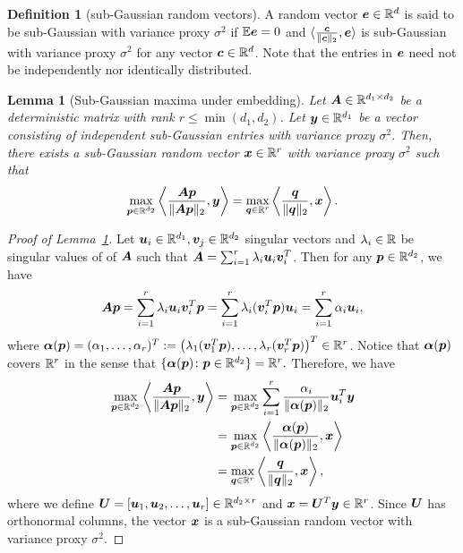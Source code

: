 \documentclass[12pt]{article}
\newtheorem{lem}{Lemma}
\theoremstyle{definition}
\newtheorem{defn}{Definition}
\begin{document}
\begin{defn}[sub-Gaussian random vectors]
 A random vector $\bm{e} \in \mathbb{R}^d$ is said to be sub-Gaussian with variance proxy $\sigma^2$ if $\mathbb{E}\bm{e}=0$ and $\langle {\bm{c}\over \lVert\bm{c}\rVert_2}, \bm{e}\rangle$ is sub-Gaussian with variance proxy $\sigma^2$ for any vector $\bm{c}\in\mathbb{R}^d$.   Note that the entries in $\bm{e}$ need not be independently nor identically distributed. 
 \end{defn}
 
\begin{lem}[Sub-Gaussian maxima under embedding]\label{lem:embedding}
Let $\bm A\in\mathbb{R}^{d_1\times d_2}$ be a deterministic matrix with rank $r\leq\min(d_1,d_2)$. Let $\bm{y}\in\mathbb{R}^{d_1}$ be a vector consisting of independent sub-Gaussian entries with variance proxy $\sigma^2$. Then, there exists a sub-Gaussian random vector $\bm x\in\mathbb{R}^r$  with variance proxy $\sigma^2$ such that  
\begin{align}
    \max_{\bm{p}\in\mathbb{R}^{d_2}}\left\langle \frac{\bm A\bm{p}}{\|\bm A\bm{p}\|_2},\bm{y}\right\rangle = \max_{\bm{q}\in\mathbb{R}^r}\left\langle \frac{\bm{q}}{\|\bm{q}\|_2},\bm x\right\rangle.
\end{align}
\end{lem}

\begin{proof}[Proof of Lemma~\ref{lem:embedding}]
Let $\bm{u}_i\in\mathbb{R}^{d_1},\bm{v}_j\in\mathbb{R}^{d_2}$ singular vectors and $\lambda_i\in\mathbb{R}$ be singular values of of $\bm A$ such that
 $\bm A = \sum_{i=1}^r \lambda_i\bm{u}_i\bm{v}_i^T$.
Then  for any $\bm{p}\in\mathbb{R}^{d_2}$, we have 
\begin{align}
    \bm A\bm{p} = \sum_{i=1}^r\lambda_i \bm{u}_i\bm{v}_i^T\bm{p} = \sum_{i=1}^r \lambda_i(\bm{v}_i^T\bm{p}) \bm{u}_i = \sum_{i = 1}^r \alpha_i\bm{u}_i,
\end{align}
where $\boldsymbol{\alpha}(\bm{p}) = (\alpha_1,\ldots,\alpha_r)^T := \left(\lambda_1(\bm{v}_1^T\bm{p}),\ldots,\lambda_r(\bm{v}_r^T\bm{p})\right)^T\in\mathbb{R}^{r}$. Notice that $\boldsymbol{\alpha}(\bm{p})$ covers $\mathbb{R}^r$ in the sense that $\{\boldsymbol{\alpha}(\bm{p})\colon \bm{p}\in\mathbb{R}^{d_2}\} = \mathbb{R}^r.$
Therefore, we have 
\begin{align}
    \max_{\bm{p}\in\mathbb{R}^{d_2}}\left\langle \frac{\bm A\bm{p}}{\|\bm A\bm{p}\|_2},\bm{y}\right\rangle &=\max_{\bm{p}\in\mathbb{R}^{d_2}}\sum_{i=1}^r\frac{\alpha_i}{\|\boldsymbol{\alpha}(\bm{p})\|_2}\bm{u}_i^T\bm{y}\\&=\max_{\bm{p}\in\mathbb{R}^{d_2}}\left\langle \frac{\boldsymbol{\alpha}(\bm{p})}{\|\boldsymbol{\alpha}(\bm{p})\|_2},\bm x\right\rangle\\&=\max_{\bm{q}\in\mathbb{R}^r}\left\langle \frac{\bm{q}}{\|\bm{q}\|_2},\bm x\right\rangle,
\end{align}
where we define $\bm{U}=[\bm{u}_1,\bm{u}_2,\ldots,\bm{u}_r]\in\mathbb{R}^{d_2\times r}$ and $\bm x = \bm{U}^T\bm{y}\in \mathbb{R}^{r}$. Since $\bm{U}$ has orthonormal columns, the vector $\bm x$ is a sub-Gaussian random vector with variance proxy $\sigma^2$. 
\end{proof}
\end{document}
